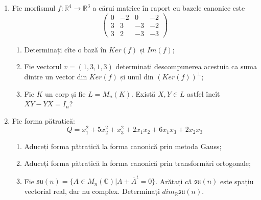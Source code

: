 \documentclass{article}
\begin{document}
\begin{enumerate}
 \item Fie morfismul $f:\mathbb{R}^4 \to \mathbb{R}^3$ a cărui matrice în raport cu bazele canonice este
$$\begin{pmatrix}
0&-2&0&-2\\
3&3&-3&-2\\
3&2&-3&-3
\end{pmatrix}$$

\begin{enumerate}
\item Determinați cîte o bază în $Ker(f)$ și $Im(f)$;
\item Fie vectorul $v=(1,3,1,3)$ determinați descompunerea acestuia ca suma dintre un vector din $Ker(f)$ și unul din $(Ker(f))^\perp$;
\item Fie $K$ un corp și fie $L=M_n(K)$. Există $X,Y \in L$ astfel încît $XY-YX=I_n$?  
\end{enumerate}
\item Fie forma pătratică:
$$Q= x_1^2+5x_2^2+x_3^2+2x_1x_2+6x_1x_3+2x_2x_3$$

\begin{enumerate}
\item Aduceți forma pătratică la forma canonică prin metoda Gauss;
\item Aduceți forma pătratică la forma canonică prin transformări ortogonale;
\item Fie $\mathfrak{su}(n)=\{ A \in M_n(\mathbb{C}) | A+\bar{A}^t=0\}$. Arătați că $\mathfrak{su}(n)$ este spațiu vectorial real, dar nu complex.
Determinați $dim_{\mathbb{R}}\mathfrak{su}(n)$.
\end{enumerate}
\end{enumerate}
\newpage
\end{document}
